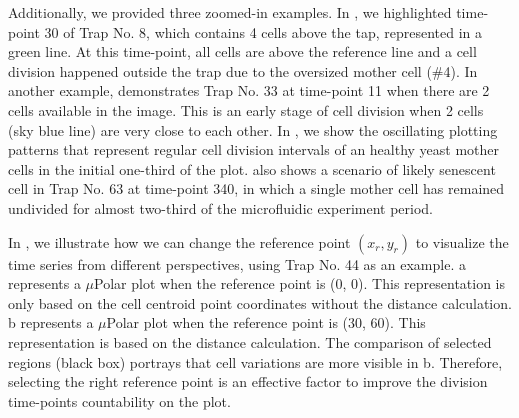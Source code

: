 \documentclass[conference]{IEEEtran}
\begin{document}
Additionally, we provided three zoomed-in examples.  
In , we highlighted time-point 30 of Trap No. 8, which contains 4 cells above the tap, represented in a green line. 
At this time-point, all cells are above the reference line and a cell division happened outside the trap due to the oversized mother cell (\#4). In another example,  demonstrates Trap No. 33 at time-point 11 when there are 2 cells available in the image. This is an early stage of cell division when 2 cells (sky blue line) are very close to each other. In , we show the oscillating plotting patterns that represent regular cell division intervals of an healthy yeast mother cells in the initial one-third of the plot.  also shows a scenario of likely senescent cell in Trap No. 63 at time-point 340, in which a single mother cell has remained undivided for almost two-third of the microfluidic experiment period.

In , we illustrate how we can change the reference point $(x_{r},y_{r})$ to visualize the time series from different perspectives, using Trap No. 44 as an example. a represents a $\mu$Polar plot when the reference point is (0, 0). This representation is only based on the cell centroid point coordinates without the distance calculation. b represents a $\mu$Polar plot when the reference point is (30, 60). This representation is based on the distance calculation. The comparison of selected regions (black box) portrays that cell variations are more visible in  b. Therefore, selecting the right reference point is an effective factor to improve the division time-points countability on the plot.
\end{document}
